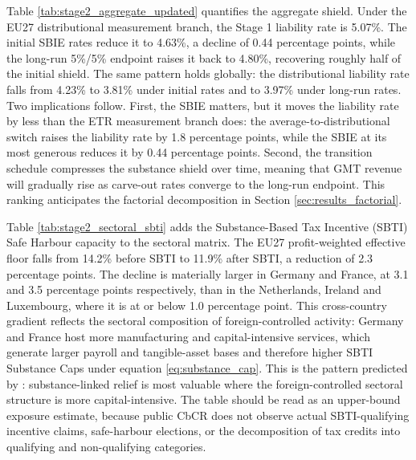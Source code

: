 \documentclass[11pt,a4paper]{article}
\begin{document}
Table \ref{tab:stage2_aggregate_updated} quantifies the aggregate shield. Under the EU27 distributional measurement branch, the Stage 1 liability rate is 5.07\%. The initial SBIE rates reduce it to 4.63\%, a decline of 0.44 percentage points, while the long-run 5\%/5\% endpoint raises it back to 4.80\%, recovering roughly half of the initial shield. The same pattern holds globally: the distributional liability rate falls from 4.23\% to 3.81\% under initial rates and to 3.97\% under long-run rates. Two implications follow. First, the SBIE matters, but it moves the liability rate by less than the ETR measurement branch does: the average-to-distributional switch raises the liability rate by 1.8 percentage points, while the SBIE at its most generous reduces it by 0.44 percentage points. Second, the transition schedule compresses the substance shield over time, meaning that GMT revenue will gradually rise as carve-out rates converge to the long-run endpoint. This ranking anticipates the factorial decomposition in Section \ref{sec:results_factorial}.




Table \ref{tab:stage2_sectoral_sbti} adds the Substance-Based Tax Incentive (SBTI) Safe Harbour capacity to the sectoral matrix. The EU27 profit-weighted effective floor falls from 14.2\% before SBTI to 11.9\% after SBTI, a reduction of 2.3 percentage points. The decline is materially larger in Germany and France, at 3.1 and 3.5 percentage points respectively, than in the Netherlands, Ireland and Luxembourg, where it is at or below 1.0 percentage point. This cross-country gradient reflects the sectoral composition of foreign-controlled activity: Germany and France host more manufacturing and capital-intensive services, which generate larger payroll and tangible-asset bases and therefore higher SBTI Substance Caps under equation \eqref{eq:substance_cap}. This is the pattern predicted by \citet{schjelderup2024}: substance-linked relief is most valuable where the foreign-controlled sectoral structure is more capital-intensive. The table should be read as an upper-bound exposure estimate, because public CbCR does not observe actual SBTI-qualifying incentive claims, safe-harbour elections, or the decomposition of tax credits into qualifying and non-qualifying categories.


\end{document}
